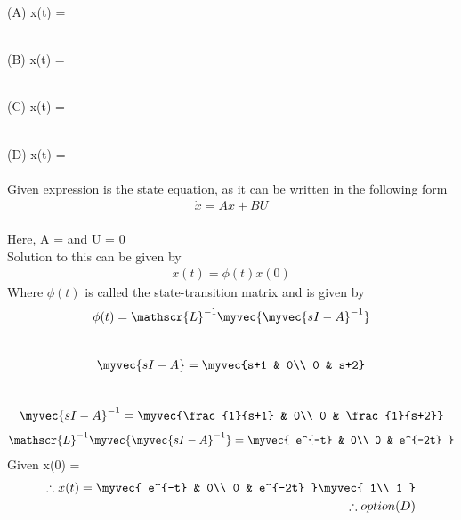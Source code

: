 \begin{enumerate}[label=\thesubsection.\arabic*.,ref=\thesubsection.\theenumi]
(A) x(t) =

\\

(B) x(t) =

\\

(C) x(t) =

\\

(D) x(t) =
\\
\\
\solution Given expression is the state equation, as it can be written in the following form
\begin{align}
    \dot{x} =Ax + BU
\end{align} \\
Here, A =   and U = 0\\
Solution to this can be given by
\begin{align}
    x(t) = \phi(t)x(0)
\end{align}
Where $\phi(t)$ is called the state-transition matrix and is given by\\
\begin{align}
    \phi(t) = \mathscr{L}^{-1}\myvec{\myvec{sI -A}^{-1}}
\end{align}\\
\begin{align}
    \myvec{sI-A} = \myvec{s+1 & 0\\ 0 & s+2}
\end{align}\\
\begin{align}
    \myvec{sI-A}^{-1} 
    = \myvec{\frac{1}{s+1} & 0\\
            0 & \frac{1}{s+2}}
\end{align}
\begin{align}
    \mathscr{L}^{-1}\myvec{\myvec{sI -A}^{-1}} = \myvec{
e^{-t} & 0\\
0 & e^{-2t}
}
\end{align}
Given x(0) = 
\begin{align}
    \therefore x(t) = \myvec{
e^{-t} & 0\\
0 & e^{-2t}
}
\myvec{
1\\
1
}\\ 
\therefore option (D)   
\end{align}
\newline
\newline


\end{enumerate}
